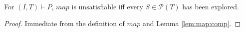 
\begin{corollary}
\label{cor:map:cc}
For $(I, T) \vdash P$, $map$ is unsatisfiable iff every $S \in \mathcal{P}(T)$ has been explored.
\end{corollary}
\begin{proof}
Immediate from the definition of $map$ and Lemma \ref{lem:map:comp}.
\end{proof}


